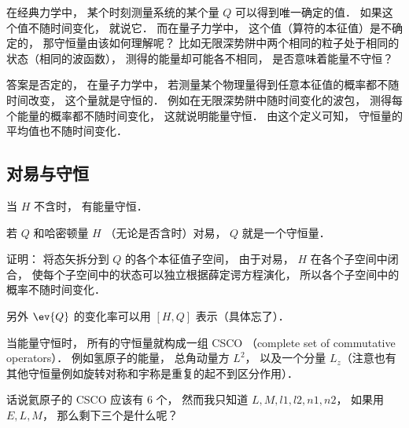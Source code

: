 
在经典力学中， 某个时刻测量系统的某个量 $Q$ 可以得到唯一确定的值． 如果这个值不随时间变化， 就说它． 而在量子力学中， 这个值（算符的本征值）是不确定的， 那守恒量由该如何理解呢？ 比如无限深势阱中两个相同的粒子处于相同的状态（相同的波函数）， 测得的能量却可能各不相同， 是否意味着能量不守恒？

答案是否定的， 在量子力学中， 若测量某个物理量得到任意本征值的概率都不随时间改变， 这个量就是守恒的． 例如在无限深势阱中随时间变化的波包， 测得每个能量的概率都不随时间变化， 这就说明能量守恒． 由这个定义可知， 守恒量的平均值也不随时间变化．

\subsection{对易与守恒}
当 $H$ 不含时， 有能量守恒．

若 $Q$ 和哈密顿量 $H$ （无论是否含时）对易， $Q$ 就是一个守恒量．

证明： 将态矢拆分到 $Q$ 的各个本征值子空间， 由于对易， $H$ 在各个子空间中闭合， 使每个子空间中的状态可以独立根据薛定谔方程演化， 所以各个子空间中的概率不随时间变化．

另外 $\ev{Q}$ 的变化率可以用 $[H, Q]$ 表示（具体忘了）．

当能量守恒时， 所有的守恒量就构成一组 CSCO （complete set of commutative operators）． 例如氢原子的能量， 总角动量方 $L^2$， 以及一个分量 $L_z$（注意也有其他守恒量例如旋转对称和宇称是重复的起不到区分作用）． 

话说氦原子的 CSCO 应该有 6 个， 然而我只知道 $L,M,l1,l2,n1,n2$， 如果用 $E,L,M$， 那么剩下三个是什么呢？
